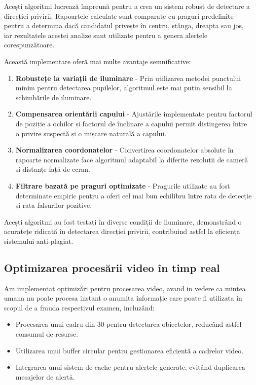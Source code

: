 \documentclass[12pt,a4paper]{article}
\begin{document}
Acești algoritmi lucrează împreună pentru a crea un sistem robust de detectare a direcției privirii. Rapoartele calculate sunt comparate cu praguri predefinite pentru a determina dacă candidatul privește în centru, stânga, dreapta sau jos, iar rezultatele acestei analize sunt utilizate pentru a genera alertele corespunzătoare.

Această implementare oferă mai multe avantaje semnificative:

\begin{enumerate}
    \item \textbf{Robustețe la variații de iluminare} - Prin utilizarea metodei punctului minim pentru detectarea pupilelor, algoritmul este mai puțin sensibil la schimbările de iluminare.
    
    \item \textbf{Compensarea orientării capului} - Ajustările implementate pentru factorul de poziție a ochilor și factorul de înclinare a capului permit distingerea între o privire suspectă și o mișcare naturală a capului.
    
    \item \textbf{Normalizarea coordonatelor} - Convertirea coordonatelor absolute în rapoarte normalizate face algoritmul adaptabil la diferite rezoluții de cameră și distanțe față de ecran.
    
    \item \textbf{Filtrare bazată pe praguri optimizate} - Pragurile utilizate au fost determinate empiric pentru a oferi cel mai bun echilibru între rata de detecție și rata falsurilor pozitive.
\end{enumerate}

Acești algoritmi au fost testați în diverse condiții de iluminare, demonstrând o acuratețe ridicată în detectarea direcției privirii, contribuind astfel la eficiența sistemului anti-plagiat.

\subsection{Optimizarea procesării video în timp real}
Am implementat optimizări pentru procesarea video, avand in vedere ca mintea umana nu poate procesa instant o anumita informație care poate fi utilizata in scopul de a frauda respectivul examen, incluzând:
\begin{itemize}
    \item Procesarea unui cadru din 30 pentru detectarea obiectelor, reducând astfel consumul de resurse.
    \item Utilizarea unui buffer circular pentru gestionarea eficientă a cadrelor video.
    \item Integrarea unui sistem de cache pentru alertele generate, evitând duplicarea mesajelor de alertă.
\end{itemize}
\end{document}
